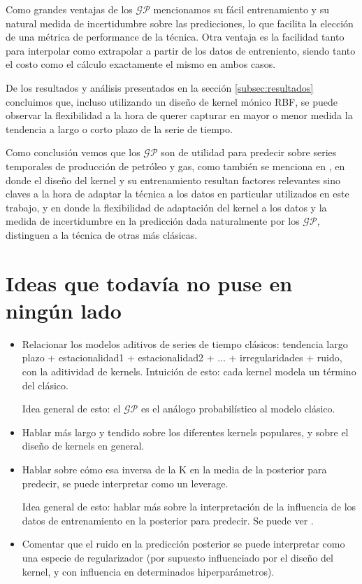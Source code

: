 \documentclass[a4paper]{article}
\newcommand{\gp}{\ensuremath{\mathcal{GP}}}
\begin{document}
Como grandes ventajas de los $\gp$ mencionamos su fácil entrenamiento y su natural medida de incertidumbre sobre las predicciones, lo que facilita la elección de una métrica de performance de la técnica. Otra ventaja es la facilidad tanto para interpolar como extrapolar a partir de los datos de entreniento, siendo tanto el costo como el cálculo exactamente el mismo en ambos casos.

De los resultados y análisis presentados en la sección \ref{subsec:resultados} concluimos que, incluso utilizando un diseño de kernel mónico RBF, se puede observar la flexibilidad a la hora de querer capturar en mayor o menor medida la tendencia a largo o corto plazo de la serie de tiempo.

Como conclusión vemos que los $\gp$ son de utilidad para predecir sobre series temporales de producción de petróleo y gas, como también se menciona en \cite{gppaper1}, en donde el diseño del kernel y su entrenamiento resultan factores relevantes sino claves a la hora de adaptar la técnica a los datos en particular utilizados en este trabajo, y en donde la flexibilidad de adaptación del kernel a los datos y la medida de incertidumbre en la predicción dada naturalmente por los $\gp$, distinguen a la técnica de otras más clásicas.



\section*{Ideas que todavía no puse en ningún lado}
\begin{itemize}
	\item Relacionar los modelos aditivos de series de tiempo clásicos: tendencia largo plazo + estacionalidad1 + estacionalidad2 + ... + irregularidades + ruido, con la aditividad de kernels. Intuición de esto: cada kernel modela un término del clásico.
	
	Idea general de esto: el $\gp$ es el análogo probabilístico al modelo clásico.
	
	\item Hablar más largo y tendido sobre los diferentes kernels populares, y sobre el diseño de kernels en general.
	
	\item Hablar sobre cómo esa inversa de la K en la media de la posterior para predecir, se puede interpretar como un leverage.
	
	Idea general de esto: hablar más sobre la interpretación de la influencia de los datos de entrenamiento en la posterior para predecir. Se puede ver \cite{tesisduvenaud}.
	
	\item Comentar que el ruido en la predicción posterior se puede interpretar como una especie de regularizador (por supuesto influenciado por el diseño del kernel, y con influencia en determinados hiperparámetros).
\end{itemize}
\end{document}
